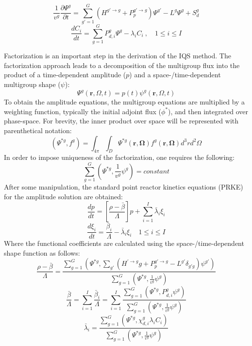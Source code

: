 \documentclass{anstrans}
\renewcommand{\vec}[1]{\bm{#1}} %
\newcommand{\bs}[1]{\mathbf{#1}}
\renewcommand{\div}{\bs{\nabla}\! \cdot \!}
\newcommand{\grad}{\bs{\nabla}}
\newcommand{\be}{\begin{equation}}
\newcommand{\ee}{\end{equation}}
\begin{document}
\be
\frac{1}{v^g}\frac{\partial \Psi^g}{\partial t} = \sum_{g'=1}^G \left(H^{g'\to g} + P_p^{g' \to g} \right) \Psi^{g'} - L^g\Psi^g + S_{d}^g
\ee 
\label{eq:flux}
\be
\frac{dC_i}{dt} = \sum_{g=1}^G P_{d,i}^g \Psi^{g} - \lambda_i C_i \ , \quad 1 \le i \le I 
\label{eq:precursor}
\ee

Factorization is an important step in the derivation of the IQS method. The factorization approach leads to a decomposition of the multigroup flux into the product of a time-dependent amplitude ($p$) and a space-/time-dependent multigroup shape ($\psi$):
\be
\Psi^g(\vec{r},\Omega,t)=p(t)\psi^g(\vec{r},\Omega,t)
\ee
To obtain the amplitude equations, the multigroup equations are multiplied by a weighting function, typically the initial adjoint flux ($\phi^*$), and then integrated over phase-space.  For brevity, the inner product over space will be represented with parenthetical notation:
\be
\left(\Psi^{*g},f^g\right) = \int_{4\pi}\int_D \Psi^{*g}(\vec{r},\vec{\Omega})f^g(\vec{r},\vec{\Omega})d^3r d^2\Omega
\ee
In order to impose uniqueness of the factorization, one requires the following:
\be
\sum_{g=1}^G\left(\Psi^{*g},\frac{1}{v^g}\psi^g\right) = \textit{constant}
\ee
After some manipulation, the standard point reactor kinetics equations (PRKE) for the amplitude solution are obtained:
\be
\frac{dp}{dt}=\left[\frac{\rho-\bar{\beta}}{\Lambda}\right]p+\sum_{i=1}^I\bar{\lambda}_i\xi_i
\ee
\be
\frac{d\xi_i}{dt}=\frac{\bar{\beta}_i}{\Lambda}-\bar{\lambda}_i\xi_i \quad 1 \le i \le I 
\ee
Where the functional coefficients are calculated using the space-/time-dependent shape function as follows:
\be
\frac{\rho-\bar{\beta}}{\Lambda}=\frac{ \sum_{g=1}^G\left(\Psi^{*g},\sum_{g'}(H^{' \to g}g+P_p^{g' \to g}-L^{g'}\delta_{g'g})\psi^{g'}\right)}{\sum_{g=1}^G\left(\Psi^{*g},\frac{1}{v^g}\psi^g\right)}
\label{eq:rmb}
\ee
\be
\frac{\bar{\beta}}{\Lambda}=\sum_{i=1}^I\frac{\bar{\beta}_i}{\Lambda}=\sum_{i=1}^I\frac{\sum_{g=1}^G(\Psi^{*g}, P_{d,i}^g \psi^g)}{\sum_{g=1}^G\left(\Psi^{*g},\frac{1}{v^g}\psi^g\right)}
\ee
\be
\bar{\lambda}_i=\frac{\sum_{g=1}^G(\Psi^{*g},\chi_{d,i}^g\lambda_i C_i)}{\sum_{g=1}^G\left(\Psi^{*g},\frac{1}{v^g}\psi^g\right)}
\label{eq:l}
\ee
\end{document}
